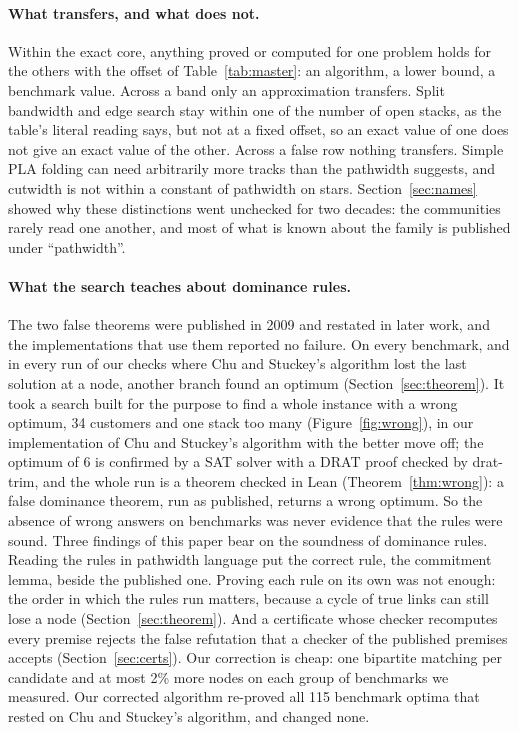 \paragraph{What transfers, and what does not.} Within the exact core, anything
proved or computed for one problem holds for the others with the offset of
Table~\ref{tab:master}: an algorithm, a lower bound, a benchmark value. Across
a band only an approximation transfers. Split bandwidth and edge search stay
within one of the number of open stacks, as the table's literal reading says,
but not at a fixed offset, so an exact value of one does not give an exact
value of the other. Across a false row nothing transfers. Simple PLA folding
can need arbitrarily more tracks than the pathwidth suggests, and cutwidth is
not within a constant of pathwidth on stars. Section~\ref{sec:names} showed why
these distinctions went unchecked for two decades: the communities rarely read
one another, and most of what is known about the family is published under
``pathwidth''.

\paragraph{What the search teaches about dominance rules.} The two false
theorems were published in 2009 and restated in later work, and the
implementations that use them reported no failure. On every benchmark, and in
every run of our checks where Chu and Stuckey's algorithm lost the last solution at a
node, another branch found an optimum (Section~\ref{sec:theorem}). It took a
search built for the purpose to find a whole instance with a wrong optimum,
34 customers and one stack too many (Figure~\ref{fig:wrong}), in our
implementation of Chu and Stuckey's algorithm with the better move off; the optimum
of 6 is confirmed by a SAT solver with a DRAT proof checked by drat-trim, and the whole run is a theorem checked in Lean
(Theorem~\ref{thm:wrong}): a false dominance theorem, run as published,
returns a wrong optimum. So the absence of
wrong answers on benchmarks was never evidence that the rules were sound. Three findings of this paper bear on the soundness of dominance rules. Reading the rules in pathwidth language put the correct rule, the
commitment lemma, beside the published one. Proving each rule on its own was
not enough: the order in which the rules run matters, because a cycle of true
links can still lose a node (Section~\ref{sec:theorem}). And a certificate
whose checker recomputes every premise rejects the false refutation that a
checker of the published premises accepts (Section~\ref{sec:certs}). Our correction
is cheap: one bipartite matching per candidate and at most 2\% more nodes on each group of benchmarks we measured. Our corrected algorithm re-proved all 115 benchmark optima that
rested on Chu and Stuckey's algorithm, and changed none.

